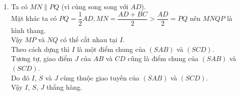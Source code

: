 \begin{ex}
{\begin{enumerate}
			Do đó $NQ$ là đường trung bình của tam giác $SCD$ suy ra $SC\parallel NQ$.\\ Suy ra  $SC\parallel(MNP)$.
			\item Ta có  $MN\parallel PQ$ (vì cùng song song với $AD$).\\
			Mặt khác ta có  $PQ=\dfrac{1}{2} AD, MN=\dfrac{AD+BC}{2} > \dfrac{AD}{2}=PQ$ nên $MNQP$ là hình thang.\\
			Vậy $MP$ và $NQ$ có thể cắt  nhau tại $I$.\\
			Theo cách dựng thì $I$ là một điểm  chung của $(SAB)$ và $(SCD)$.\\
			Tương tự, giao điểm $J$ của $AB$ và $CD$ cũng là  điểm chung của $(SAB)$ và $(SCD)$.\\
			Do đó  $I$, $S$ và $J$ cùng thuộc giao tuyến của $(SAB)$ và $(SCD)$.\\
			Vậy $I$, $S$, $J$ thẳng  hàng.
		\end{enumerate}
	 }
\end{ex}

